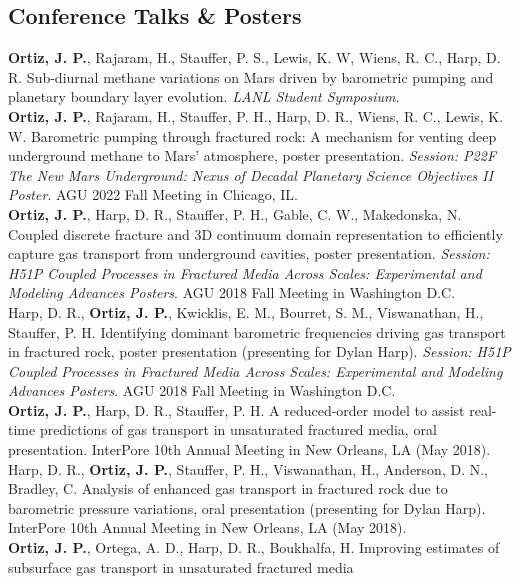 \documentclass[11pt, letterpaper]{article}
\newcommand{\years}[1]{\marginnote{\scriptsize #1}}
\begin{document}
\subsection*{Conference Talks \& Posters}
\years{2023}\textbf{Ortiz, J. P.}, Rajaram, H., Stauffer, P. S., Lewis, K. W,
Wiens, R. C., Harp, D. R. Sub-diurnal methane variations on Mars driven by
barometric pumping and planetary boundary layer evolution. \textit{LANL Student
Symposium}.\\
\years{2022}\textbf{Ortiz, J. P.}, Rajaram, H., Stauffer, P. H., Harp, D. R.,
Wiens, R. C., Lewis, K. W. Barometric pumping through fractured rock: A
mechanism for venting deep underground methane to Mars' atmosphere, poster
presentation. \textit{Session: P22F The New Mars Underground: Nexus of Decadal
Planetary Science Objectives II Poster}. AGU 2022 Fall Meeting in Chicago, IL.\\ 
\years{2018}\textbf{Ortiz, J. P.}, Harp, D. R., Stauffer, P. H., Gable, C. W.,
Makedonska, N. Coupled discrete fracture and 3D continuum domain representation
to efficiently capture gas transport from underground cavities, poster
presentation. \textit{Session: H51P Coupled Processes in Fractured Media Across
Scales: Experimental and Modeling Advances Posters}. AGU 2018 Fall Meeting in
Washington D.C.\\
\years{2018}Harp, D. R., \textbf{Ortiz, J. P.}, Kwicklis, E. M., Bourret, S.
M., Viswanathan, H., Stauffer, P. H. Identifying dominant barometric
frequencies driving gas transport in fractured rock, poster presentation
(presenting for Dylan Harp). \textit{Session: H51P Coupled Processes in
Fractured Media Across Scales: Experimental and Modeling Advances Posters}. AGU
2018 Fall Meeting in Washington D.C.\\
\years{2018}\textbf{Ortiz, J. P.}, Harp, D. R., Stauffer, P. H. A reduced-order
model to assist real-time predictions of gas transport in unsaturated fractured
media, oral presentation. InterPore 10th Annual Meeting in New Orleans, LA (May
2018).\\
\years{2018}Harp, D. R., \textbf{Ortiz, J. P.}, Stauffer, P. H., Viswanathan,
H., Anderson, D. N., Bradley, C. Analysis of enhanced gas transport in
fractured rock due to barometric pressure variations, oral presentation
(presenting for Dylan Harp). InterPore 10th Annual Meeting in New Orleans, LA
(May 2018).\\
\years{2017}\textbf{Ortiz, J. P.}, Ortega, A. D., Harp, D. R., Boukhalfa, H.
Improving estimates of subsurface gas transport in unsaturated fractured media
\end{document}
